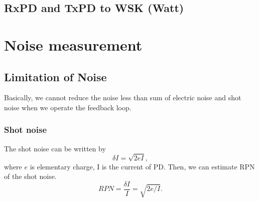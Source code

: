 \subsection{RxPD and TxPD to WSK (Watt)}


\section{Noise measurement}
\subsection{Limitation of Noise}
Basically, we cannot reduce the noise less than sum of electric noise and shot noise when we operate the feedback loop.
\subsubsection{Shot noise}
The shot noise can be written by
\begin{equation}
\delta I=\sqrt{2eI},
\end{equation}
where $e$ is elementary charge, I is the current of PD. Then, we can estimate RPN of the shot noise.
\begin{equation}
RPN=\frac{\delta I}{I}=\sqrt{2e/I}.
\end{equation}

			\begin{center}
			\end{center}
